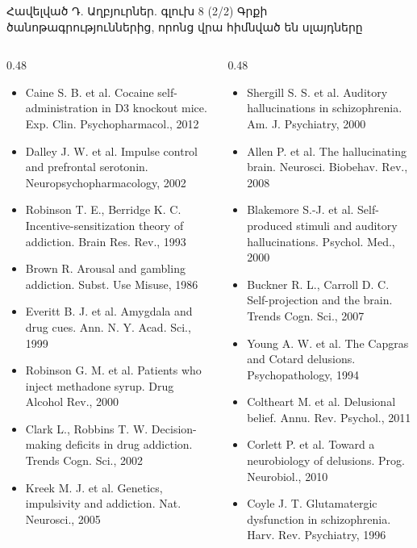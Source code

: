 \begin{frame}{Հավելված Դ. Աղբյուրներ. գլուխ 8 (2/2)}
  \scriptsize
  Գրքի ծանոթագրություններից, որոնց վրա հիմնված են սլայդները\par\smallskip
  \begin{columns}[T]
    \begin{column}{0.48\textwidth}
      \begin{itemize}\setlength{\itemsep}{0.3mm}
        \item Caine S. B. et al. Cocaine self-administration in D3 knockout mice. Exp. Clin. Psychopharmacol., 2012
        \item Dalley J. W. et al. Impulse control and prefrontal serotonin. Neuropsychopharmacology, 2002
        \item Robinson T. E., Berridge K. C. Incentive-sensitization theory of addiction. Brain Res. Rev., 1993
        \item Brown R. Arousal and gambling addiction. Subst. Use Misuse, 1986
        \item Everitt B. J. et al. Amygdala and drug cues. Ann. N. Y. Acad. Sci., 1999
        \item Robinson G. M. et al. Patients who inject methadone syrup. Drug Alcohol Rev., 2000
        \item Clark L., Robbins T. W. Decision-making deficits in drug addiction. Trends Cogn. Sci., 2002
        \item Kreek M. J. et al. Genetics, impulsivity and addiction. Nat. Neurosci., 2005
      \end{itemize}
    \end{column}
    \begin{column}{0.48\textwidth}
      \begin{itemize}\setlength{\itemsep}{0.3mm}
        \item Shergill S. S. et al. Auditory hallucinations in schizophrenia. Am. J. Psychiatry, 2000
        \item Allen P. et al. The hallucinating brain. Neurosci. Biobehav. Rev., 2008
        \item Blakemore S.-J. et al. Self-produced stimuli and auditory hallucinations. Psychol. Med., 2000
        \item Buckner R. L., Carroll D. C. Self-projection and the brain. Trends Cogn. Sci., 2007
        \item Young A. W. et al. The Capgras and Cotard delusions. Psychopathology, 1994
        \item Coltheart M. et al. Delusional belief. Annu. Rev. Psychol., 2011
        \item Corlett P. et al. Toward a neurobiology of delusions. Prog. Neurobiol., 2010
        \item Coyle J. T. Glutamatergic dysfunction in schizophrenia. Harv. Rev. Psychiatry, 1996
      \end{itemize}
    \end{column}
  \end{columns}
\end{frame}

